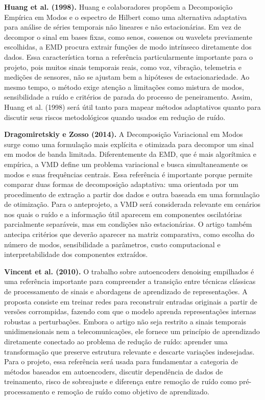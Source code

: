 \noindent\textbf{Huang et al. (1998).} Huang e colaboradores propõem a Decomposição Empírica em Modos e o espectro de Hilbert como uma alternativa adaptativa para análise de séries temporais não lineares e não estacionárias. Em vez de decompor o sinal em bases fixas, como senos, cossenos ou wavelets previamente escolhidas, a EMD procura extrair funções de modo intrínseco diretamente dos dados. Essa característica torna a referência particularmente importante para o projeto, pois muitos sinais temporais reais, como voz, vibração, telemetria e medições de sensores, não se ajustam bem a hipóteses de estacionariedade. Ao mesmo tempo, o método exige atenção a limitações como mistura de modos, sensibilidade a ruído e critérios de parada do processo de peneiramento. Assim, Huang et al. (1998) será útil tanto para mapear métodos adaptativos quanto para discutir seus riscos metodológicos quando usados em redução de ruído.

\noindent\textbf{Dragomiretskiy e Zosso (2014).} A Decomposição Variacional em Modos surge como uma formulação mais explícita e otimizada para decompor um sinal em modos de banda limitada. Diferentemente da EMD, que é mais algorítmica e empírica, a VMD define um problema variacional e busca simultaneamente os modos e suas frequências centrais. Essa referência é importante porque permite comparar duas formas de decomposição adaptativa: uma orientada por um procedimento de extração a partir dos dados e outra baseada em uma formulação de otimização. Para o anteprojeto, a VMD será considerada relevante em cenários nos quais o ruído e a informação útil aparecem em componentes oscilatórias parcialmente separáveis, mas em condições não estacionárias. O artigo também antecipa critérios que deverão aparecer na matriz comparativa, como escolha do número de modos, sensibilidade a parâmetros, custo computacional e interpretabilidade dos componentes extraídos.

\noindent\textbf{Vincent et al. (2010).} O trabalho sobre autoencoders denoising empilhados é uma referência importante para compreender a transição entre técnicas clássicas de processamento de sinais e abordagens de aprendizado de representações. A proposta consiste em treinar redes para reconstruir entradas originais a partir de versões corrompidas, fazendo com que o modelo aprenda representações internas robustas a perturbações. Embora o artigo não seja restrito a sinais temporais unidimensionais nem a telecomunicações, ele fornece um princípio de aprendizado diretamente conectado ao problema de redução de ruído: aprender uma transformação que preserve estrutura relevante e descarte variações indesejadas. Para o projeto, essa referência será usada para fundamentar a categoria de métodos baseados em autoencoders, discutir dependência de dados de treinamento, risco de sobreajuste e diferença entre remoção de ruído como pré-processamento e remoção de ruído como objetivo de aprendizado.

